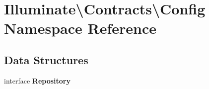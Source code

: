 \section{Illuminate\textbackslash{}Contracts\textbackslash{}Config Namespace Reference}
\label{namespace_illuminate_1_1_contracts_1_1_config}
\subsection*{Data Structures}
\begin{DoxyCompactItemize}
\item 
interface {\bf Repository}
\end{DoxyCompactItemize}
